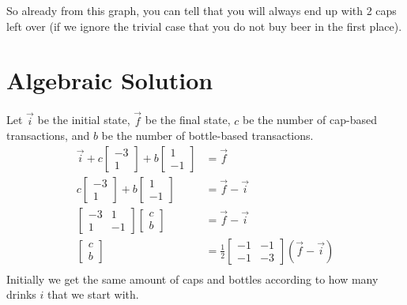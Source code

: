 \documentclass[letterpaper, 12pt]{article}
\begin{document}
So already from this graph, you can tell that you will always end up with 2 caps left over (if we ignore the trivial case that you do not buy beer in the first place).
\section{Algebraic Solution}
Let $\vec{i}$ be the initial state, $\vec{f}$ be the final state, $c$ be the number of cap-based transactions, and $b$ be the number of bottle-based transactions.
\begin{align*}
    \vec{i}
    + c
    \begin{bmatrix}
        -3\\
        1
    \end{bmatrix}
    + b
    \begin{bmatrix}
        1\\
        -1
    \end{bmatrix}
    &=
    \vec{f}\\
    c
    \begin{bmatrix}
        -3\\
        1
    \end{bmatrix}
    + b
    \begin{bmatrix}
        1\\
        -1
    \end{bmatrix}
    &=
    \vec{f} - \vec{i}\\
    \begin{bmatrix}
        -3 & 1\\
         1 &-1
    \end{bmatrix}
    \begin{bmatrix}
        c\\
        b
    \end{bmatrix}
    &=
    \vec{f} - \vec{i}\\
    \begin{bmatrix}
        c\\
        b
    \end{bmatrix}
    &=
    \frac{1}{2}
    \begin{bmatrix}
        -1 &-1\\
        -1 &-3
    \end{bmatrix}
    (\vec{f} - \vec{i})\\
\end{align*}
Initially we get the same amount of caps and bottles according to how many drinks $i$ that we start with.
\end{document}
